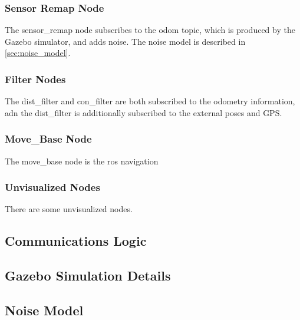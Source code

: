 \documentclass[thesis.tex]{subfile}
\begin{document}
\subsubsection{Sensor Remap Node}
The sensor\_remap node subscribes to the odom topic, which is produced by the Gazebo simulator, and adds noise. The noise model is described in \autoref{sec:noise_model}.

\subsubsection{Filter Nodes}
The \gls{dist_filter} and \gls{con_filter} are both subscribed to the odometry information, adn the \gls{dist_filter} is additionally subscribed to the external poses and GPS.

\subsubsection{Move\_Base Node}
The move\_base node is the \gls{ros} navigation
\subsubsection{Unvisualized Nodes}
There are some unvisualized nodes.
\subsection{Communications Logic}
\subsection{Gazebo Simulation Details}
\subsection{Noise Model} \label{sec:noise_model}
\end{document}
